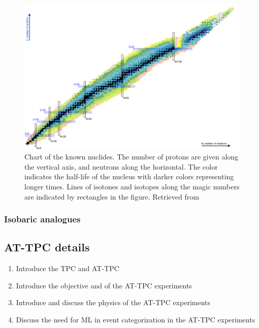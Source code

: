 
\begin{figure}
\centering
\includegraphics[width=\textwidth]{../plots/chart_nucleides}
\caption[Chart of the nuclides]{Chart of the known nuclides. The number of protons are given along the vertical axis, and neutrons along the horizontal. The color indicates the half-life of the nucleus with darker colors representing longer times. Lines of isotones and isotopes along the magic numbers are indicated by rectangles in the figure. Retrieved from \cite{Sonzogni2019}}
\end{figure}

\subsubsection{Isobaric analogues}

\subsection{AT-TPC details}


\begin{enumerate}
	\item Introduce the TPC and AT-TPC
	\item Introduce the objective and of the AT-TPC experiments
	\item Introduce and discuss the physics of the AT-TPC experiments 
	\item Discuss the need for ML in event categorization in the AT-TPC experiments 
\end{enumerate}